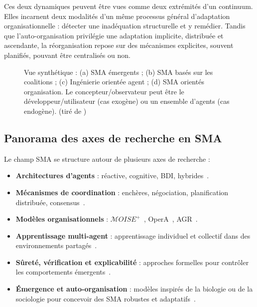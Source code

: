 Ces deux dynamiques peuvent être vues comme deux extrémités d'un continuum. Elles incarnent deux modalités d'un même processus général d'adaptation organisationnelle : détecter une inadéquation structurelle et y remédier. Tandis que l'auto-organisation privilégie une adaptation implicite, distribuée et ascendante, la réorganisation repose sur des mécanismes explicites, souvent planifiés, pouvant être centralisés ou non.

\begin{figure}[h]
    \centering
    \resizebox{\textwidth}{!}{%
        
    }
    \caption{Vue synthétique : (a) \ac{SMA} émergents ; (b) \ac{SMA} basés sur les coalitions ; (c) Ingénierie orientée agent ; (d) \ac{SMA} orientés organisation. Le concepteur/observateur peut être le développeur/utilisateur (cas exogène) ou un ensemble d'agents (cas endogène). (tiré de \cite{Picard2009reorganisation})}
    \label{fig:auto_vs_topdown}
\end{figure}

\subsection*{Panorama des axes de recherche en \ac{SMA}}

Le champ \ac{SMA} se structure autour de plusieurs axes de recherche :

\begin{itemize}
    \item \textbf{Architectures d'agents} : réactive, cognitive, \ac{BDI}, hybrides~\cite{Georgeff1987}.
    \item \textbf{Mécanismes de coordination} : enchères, négociation, planification distribuée, consensus~\cite{Sandholm1999,Durfee2001}.
    \item \textbf{Modèles organisationnels} : $\mathcal{M}OISE^+$~\cite{hubner2002moise,Hannoun2000}, OperA~\cite{Dignum2004}, \ac{AGR}~\cite{Ferber2004}.
    \item \textbf{Apprentissage multi-agent} : apprentissage individuel et collectif dans des environnements partagés~\cite{Zhang2021}.
    \item \textbf{Sûreté, vérification et explicabilité} : approches formelles pour contrôler les comportements émergents~\cite{Boella2006}.
    \item \textbf{Émergence et auto-organisation} : modèles inspirés de la biologie ou de la sociologie pour concevoir des \ac{SMA} robustes et adaptatifs~\cite{DiMarzoSerugendo2006,Heylighen1999}.
\end{itemize}


